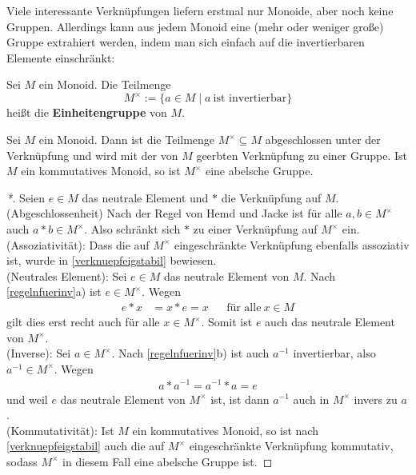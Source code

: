 \noindent Viele interessante Verknüpfungen liefern erstmal nur Monoide, aber noch keine Gruppen. Allerdings kann aus jedem Monoid eine (mehr oder weniger große) Gruppe extrahiert werden, indem man sich einfach auf die invertierbaren Elemente einschränkt:


\begin{defin} 
    Sei $M$ ein Monoid. Die Teilmenge
        \[ M^\times := \{a\in M\mid a\ \text{ist invertierbar} \} \]
    heißt die \textbf{Einheitengruppe} von $M$.
\end{defin}


\begin{satz} \label{einheitengruppe}
    Sei $M$ ein Monoid. Dann ist die Teilmenge $M^\times\subseteq M$ abgeschlossen unter der Verknüpfung und wird mit der von $M$ geerbten Verknüpfung zu einer Gruppe. Ist $M$ ein kommutatives Monoid, so ist $M^\times$ eine abelsche Gruppe.
\end{satz}
\begin{proof}[*]
    Seien $e\in M$ das neutrale Element und $*$ die Verknüpfung auf $M$. \\[0.5em]
    (Abgeschlossenheit) Nach der Regel von Hemd und Jacke ist für alle $a,b\in M^\times$ auch $a*b\in M^\times$. Also schränkt sich $*$ zu einer Verknüpfung auf $M^\times$ ein. \\[0.5em]
    (Assoziativität): Dass die auf $M^\times$ eingeschränkte Verknüpfung ebenfalls assoziativ ist, wurde in \cref{verknuepfeigstabil} bewiesen. \\[0.5em]
    (Neutrales Element): Sei $e\in M$ das neutrale Element von $M$. Nach \cref{regelnfuerinv}a) ist $e\in M^\times$. Wegen
    \begin{align*}
        e*x& =x*e=x && \text{für alle}\ x\in M
    \end{align*}
    gilt dies erst recht auch für alle $x\in M^\times$. Somit ist $e$ auch das neutrale Element von $M^\times$. \\[0.5em]
    (Inverse): Sei $a\in M^\times$. Nach \cref{regelnfuerinv}b) ist auch $a^{-1}$ invertierbar, also $a^{-1}\in M^\times$. Wegen
    \begin{align*}
        a*a^{-1}=a^{-1}*a=e
    \end{align*}
    und weil $e$ das neutrale Element von $M^\times$ ist, ist dann $a^{-1}$ auch in $M^\times$ invers zu $a$. \\[0.5em]
    (Kommutativität): Ist $M$ ein kommutatives Monoid, so ist nach \cref{verknuepfeigstabil} auch die auf $M^\times$ eingeschränkte Verknüpfung kommutativ, sodass $M^\times$ in diesem Fall eine abelsche Gruppe ist.
\end{proof}


